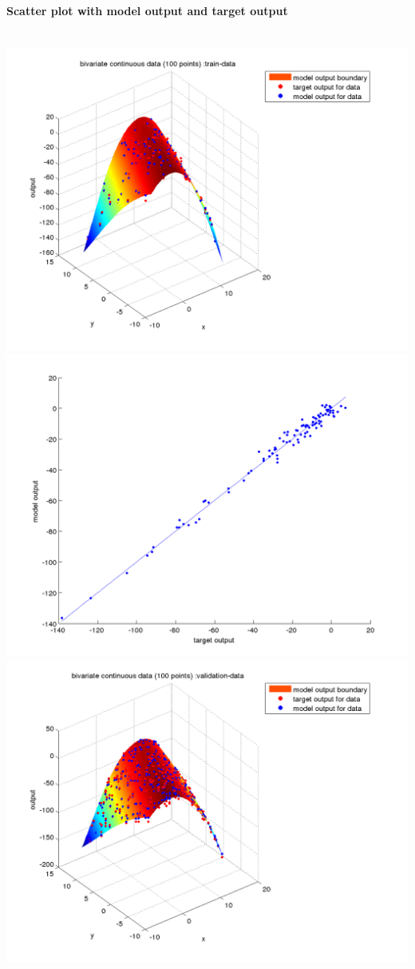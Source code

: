 \documentclass[fleqn]{article}
\newcommand{\myparagraph}[1]{\paragraph{#1}\mbox{}\\}
\begin{document}
\myparagraph{Scatter plot with model output and target output}
\includegraphics[scale=0.4]{./pics/bivariate100/_2_4/_2_4_epoch_Inf_train-data_scatter3d}
\includegraphics[scale=0.4]{./pics/bivariate100/_2_4/_2_4_epoch_Inf_train-data_scatter2d}
\includegraphics[scale=0.4]{./pics/bivariate100/_2_4/_2_4_epoch_Inf_validation-data_scatter3d}
\end{document}
